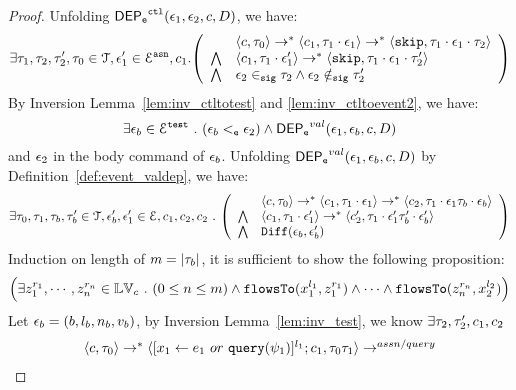 {\begin{proof}
Unfolding $\mathsf{DEP_{\mathtt{e}}}^{\mathtt{{ctl}}}(\mathtt{\epsilon}_1, \mathtt{\epsilon}_2, c, D)$, we have:
%
\[
\exists \vtrace_1, \vtrace_2, \vtrace_2', \vtrace_0 \in \mathcal{T}, 
\event_1' \in \eventset^{\asn}, {c}_1.
\left(
\begin{array}{ll}   
  & \config{{c}, \vtrace_0} \rightarrow^{*} 
    \config{{c}_1, \vtrace_1 \cdot \event_1}  \rightarrow^{*} 
    \config{\eskip,  \vtrace_1 \cdot \event_1 \cdot \vtrace_2} 
  \\ 
  \bigwedge &
  \config{{c}_1, \vtrace_1 \cdot \event_1'}  \rightarrow^{*} 
  \config{\eskip,  \vtrace_1 \cdot \event_1 \cdot \vtrace_2' } 
  \\
  \bigwedge &
  \event_2 \sigin \vtrace_2 \land \event_2 \notsigin \vtrace_2'
\end{array}
\right)
 \]
 By {Inversion Lemma~\ref{lem:inv_ctltotest} and \ref{lem:inv_ctltoevent2}}, we have:
 \[
   \exists \mathtt{\epsilon}_b \in \mathcal{E}^{\mathtt{{test}}} ~.~ (\mathtt{\epsilon}_b <_{\mathtt{e}} \mathtt{\epsilon}_2) \land \mathsf{DEP_{\mathtt{e}}}^{val}(\mathtt{\epsilon}_1, \mathtt{\epsilon}_b, c, D)
 \]
 and $\mathtt{\epsilon}_2$ in the body command of $\mathtt{\epsilon}_b$.
 Unfolding $\mathsf{DEP_{\mathtt{e}}}^{val}(\mathtt{\epsilon}_1, \mathtt{\epsilon}_b, c, D)$ by Definition~\ref{def:event_valdep}, we have:
\[
\exists \vtrace_0, \vtrace_1, \vtrace_b, \vtrace_b' \in \mathcal{T},  \event_b', \event_1' \in \eventset, 
{c}_1, {c}_2, {c}_2 \st
  \left(
  \begin{array}{ll}   
 & \config{{c}, \vtrace_0} \rightarrow^{*} 
  \config{{c}_1, \vtrace_1 \cdot \event_1}  \rightarrow^{*} 
  \config{{c}_2,  \vtrace_1 \cdot \event_1 \vtrace_b \cdot \event_b } 
  \\ 
  \bigwedge &
  \config{{c}_1, \vtrace_1 \cdot \event_1'}  \rightarrow^{*} 
  \config{{c}_2',  \vtrace_1 \cdot \event_1' \vtrace_b' \cdot \event_b' } 
  \\
  \bigwedge &
   \diff(\event_b,\event_b')
\end{array}
\right)
 \]
Induction on length of $m = |\mathtt{\tau}_b|$, it is sufficient to show the following proposition:
%
\[
\Big(\exists z_1^{r_1}, \cdots, z_n^{r_n} \in \mathbb{LV}_{{c}} ~.~ (0 \leq n \leq m )
 \land \mathtt{flowsTo}(x_1^{l_1}, z_1^{r_1}) \land \cdots \land \mathtt{flowsTo}(z_n^{r_n}, {x}_2^{l_2}) \Big)
\]
%
 Let $\mathtt{\epsilon}_b = (b, l_b, n_b, v_b)$, by {Inversion Lemma~\ref{lem:inv_test}},
we know $\exists \mathtt{\tau}_2, \mathtt{\tau}_2', {c}_1, {c}_2$
 \[
  \begin{array}{l}   
  \langle {c}, \mathtt{\tau}_0 \rangle 
  \rightarrow^{*} 
  \langle [\mathrel{ {x}_1 \leftarrow e_1~ or ~ {\tt query}(\psi_1) }]^{l_1} ; {c}_1, \mathtt{\tau}_0 \mathtt{\tau}_1 \rangle  \rightarrow^{assn/query}

\end{array}\]
\end{proof}}
